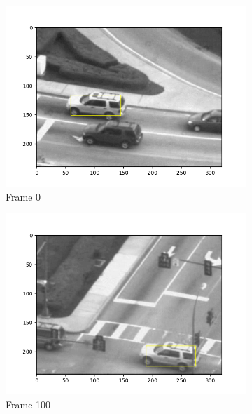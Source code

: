 \documentclass{article} %
\begin{document}
    \begin{figure}[H]
        \centering
        \begin{subfigure}[b]{0.30\textwidth}
            \centering
            \includegraphics[width=\textwidth]{q1,3_frame0.png}
            \caption{Frame 0}
        \end{subfigure}
        \begin{subfigure}[b]{0.30\textwidth}
            \centering
            \includegraphics[width=\textwidth]{q1,3_frame100.png}
            \caption{Frame 100}
        \end{subfigure}
        \begin{subfigure}[b]{0.30\textwidth}
            \centering

\end{subfigure}
\end{figure}
\end{document}
